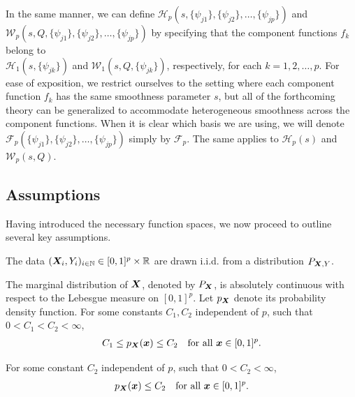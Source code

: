 In the same manner, we can define $\mathcal{H}_p(s,\{\psi_{j1}\},\{\psi_{j2}\},\dots,\{\psi_{jp}\})$ and \\ $\mathcal{W}_p(s,Q,\{\psi_{j1}\},\{\psi_{j2}\},\dots,\{\psi_{jp}\})$ by specifying that the component functions $f_k $ belong to \\ $ \mathcal{H}_1(s, \{\psi_{jk}\})$ and $ \mathcal{W}_1(s,Q, \{\psi_{jk}\})$, respectively, for each $k=1,2,\dots,p$. For ease of exposition, we restrict ourselves to the setting where each component function $f_k$ has the same smoothness parameter $s$, but all of the forthcoming theory can be generalized to accommodate heterogeneous smoothness across the component functions. When it is clear which basis we are using, we will denote  $\mathcal{F}_p(\{\psi_{j1}\},\{\psi_{j2}\},\dots,\{\psi_{jp}\})$ simply by $\mathcal{F}_p$. The same applies to $\mathcal{H}_p(s)$ and $\mathcal{W}_p(s,Q)$. 




\subsection{Assumptions}\label{sec:asssumption}
Having introduced the necessary function spaces, we now proceed to outline several key assumptions.

\begin{assumption}\label{asmp:1}
    The data $(\bm{X}_i, Y_i)_{i \in \mathbb{N}} \in [0, 1]^p \times \mathbb{R}$ are drawn i.i.d. from a distribution $P_{\bm{X},Y}$. 
\end{assumption} 

\begin{assumption}\label{asmp:2} 
The marginal distribution of $\bm{X}$, denoted by $P_{\bm{X}}$, is absolutely continuous with respect to the Lebesgue measure on $[0, 1]^p$. Let $p_{\bm{X}}$ denote its probability density function. For some constants $C_1, C_2$ independent of $p$, such that $0<C_1<C_2<\infty$,
\begin{align*}
    C_1 \leq p_{\bm{X}}(\boldsymbol{x}) \leq C_2 \quad \text{for all }\boldsymbol{x} \in [0, 1]^p.
\end{align*}
\end{assumption}

\setcounter{assumption}{1} %
\renewcommand{\theassumption}{2$'$} %
\begin{assumption}\label{asmp:2'}
    For some constant $C_2$ independent of $p$, such that $0 < C_2 < \infty$,
\begin{align*}
  p_{\bm{X}}(\boldsymbol{x}) \leq C_2 \quad \text{for all }\boldsymbol{x} \in [0, 1]^p.
\end{align*}
\end{assumption}

